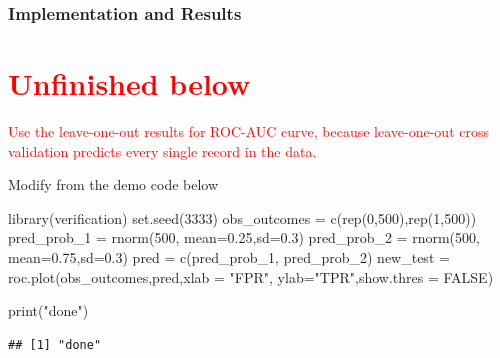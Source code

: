 \documentclass[
]{article}
\newenvironment{Shaded}{\begin{snugshade}}{\end{snugshade}}
\newcommand{\AttributeTok}[1]{\textcolor[rgb]{0.77,0.63,0.00}{#1}}
\newcommand{\ConstantTok}[1]{\textcolor[rgb]{0.00,0.00,0.00}{#1}}
\newcommand{\DecValTok}[1]{\textcolor[rgb]{0.00,0.00,0.81}{#1}}
\newcommand{\FloatTok}[1]{\textcolor[rgb]{0.00,0.00,0.81}{#1}}
\newcommand{\FunctionTok}[1]{\textcolor[rgb]{0.00,0.00,0.00}{#1}}
\newcommand{\NormalTok}[1]{#1}
\newcommand{\OtherTok}[1]{\textcolor[rgb]{0.56,0.35,0.01}{#1}}
\newcommand{\SpecialCharTok}[1]{\textcolor[rgb]{0.00,0.00,0.00}{#1}}
\newcommand{\StringTok}[1]{\textcolor[rgb]{0.31,0.60,0.02}{#1}}
\begin{document}
\hypertarget{roc-auc-results}{%
\subsubsection{Implementation and Results}\label{roc-auc-results}}

\section*{\textcolor{red}{Unfinished below}}

\textcolor{red}{Use the leave-one-out results for ROC-AUC curve, because leave-one-out cross validation predicts every single record in the data.}

Modify from the demo code below

\begin{Shaded}
\begin{Highlighting}[]
\FunctionTok{library}\NormalTok{(verification)}
\FunctionTok{set.seed}\NormalTok{(}\DecValTok{3333}\NormalTok{)}
\NormalTok{obs\_outcomes }\OtherTok{=} \FunctionTok{c}\NormalTok{(}\FunctionTok{rep}\NormalTok{(}\DecValTok{0}\NormalTok{,}\DecValTok{500}\NormalTok{),}\FunctionTok{rep}\NormalTok{(}\DecValTok{1}\NormalTok{,}\DecValTok{500}\NormalTok{))}
\NormalTok{pred\_prob\_1 }\OtherTok{=} \FunctionTok{rnorm}\NormalTok{(}\DecValTok{500}\NormalTok{, }\AttributeTok{mean=}\FloatTok{0.25}\NormalTok{,}\AttributeTok{sd=}\FloatTok{0.3}\NormalTok{)}
\NormalTok{pred\_prob\_2 }\OtherTok{=} \FunctionTok{rnorm}\NormalTok{(}\DecValTok{500}\NormalTok{, }\AttributeTok{mean=}\FloatTok{0.75}\NormalTok{,}\AttributeTok{sd=}\FloatTok{0.3}\NormalTok{)}
\NormalTok{pred }\OtherTok{=} \FunctionTok{c}\NormalTok{(pred\_prob\_1, pred\_prob\_2)}
\NormalTok{new\_test }\OtherTok{=} \FunctionTok{roc.plot}\NormalTok{(obs\_outcomes,pred,}\AttributeTok{xlab =} \StringTok{"FPR"}\NormalTok{, }\AttributeTok{ylab=}\StringTok{"TPR"}\NormalTok{,}\AttributeTok{show.thres =} \ConstantTok{FALSE}\NormalTok{)}

\FunctionTok{print}\NormalTok{(}\StringTok{"done"}\NormalTok{)}
\end{Highlighting}
\end{Shaded}

\begin{verbatim}
## [1] "done"
\end{verbatim}

\begin{Shaded}
\end{Shaded}
\end{document}
